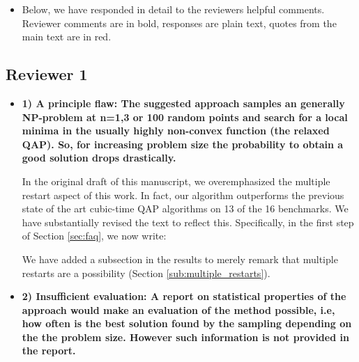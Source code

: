 \begin{itemize}
	\item Below, we have responded in detail to the reviewers helpful comments. Reviewer comments are in bold, responses are plain text, quotes from the main text are in red.
\end{itemize}
 






\newpage
\subsection*{Reviewer 1}

\begin{itemize}
	\item \textbf{1) A principle flaw:
	The suggested approach samples an generally NP-problem at n=1,3 or 100
	random points and search for a local minima in
	the usually highly non-convex function (the relaxed QAP).
	So, for increasing problem size the probability
	to obtain a good solution drops drastically.
	}

	In the original draft of this manuscript, we overemphasized the multiple restart aspect of this work.  In fact, our algorithm outperforms the previous state of the art cubic-time QAP algorithms on 13 of the 16 benchmarks. We have substantially revised the text to reflect this.  Specifically, in the first step of Section \ref{sec:faq}, we now write:
	
	
		We have added a subsection in the results to merely remark that multiple restarts are a possibility (Section \ref{sub:multiple_restarts}). %

	\item \textbf{2) Insufficient evaluation:
	A report on statistical properties of the approach
	would make an evaluation of the method possible, i.e, how often
	is the best solution found by the sampling depending on the
	the problem size.
	However such information is not provided in the report.
	}
	

\end{itemize}
